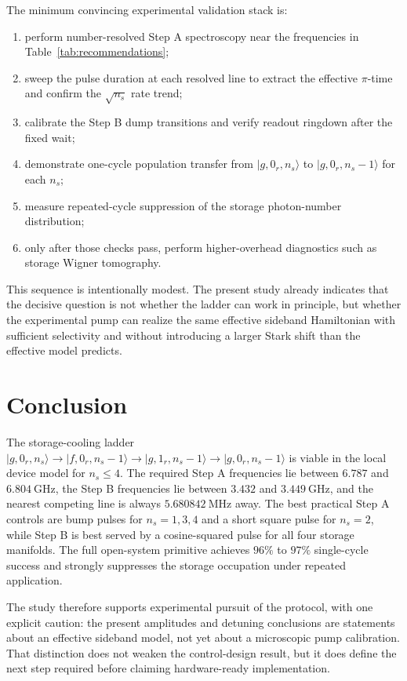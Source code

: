 \documentclass[aps,pra,twocolumn,reprint,floatfix,amsmath,amssymb]{revtex4-2}
\newcommand{\ket}[1]{\lvert #1 \rangle}
\begin{document}
The minimum convincing experimental validation stack is:
\begin{enumerate}
\item perform number-resolved Step A spectroscopy near the frequencies in Table~\ref{tab:recommendations};
\item sweep the pulse duration at each resolved line to extract the effective \(\pi\)-time and confirm the \(\sqrt{n_s}\) rate trend;
\item calibrate the Step B dump transitions and verify readout ringdown after the fixed wait;
\item demonstrate one-cycle population transfer from \(\ket{g,0_r,n_s}\) to \(\ket{g,0_r,n_s-1}\) for each \(n_s\);
\item measure repeated-cycle suppression of the storage photon-number distribution;
\item only after those checks pass, perform higher-overhead diagnostics such as storage Wigner tomography.
\end{enumerate}

This sequence is intentionally modest. The present study already indicates that the decisive question is not whether the ladder can work in principle, but whether the experimental pump can realize the same effective sideband Hamiltonian with sufficient selectivity and without introducing a larger Stark shift than the effective model predicts.

\section{Conclusion}
The storage-cooling ladder
\(\ket{g,0_r,n_s}\rightarrow\ket{f,0_r,n_s-1}\rightarrow\ket{g,1_r,n_s-1}\rightarrow\ket{g,0_r,n_s-1}\)
is viable in the local device model for \(n_s\le4\). The required Step A frequencies lie between \(6.787\) and \(\SI{6.804}{\giga\hertz}\), the Step B frequencies lie between \(3.432\) and \(\SI{3.449}{\giga\hertz}\), and the nearest competing line is always \(5.680842~\si{\mega\hertz}\) away. The best practical Step A controls are bump pulses for \(n_s=1,3,4\) and a short square pulse for \(n_s=2\), while Step B is best served by a cosine-squared pulse for all four storage manifolds. The full open-system primitive achieves \(96\%\) to \(97\%\) single-cycle success and strongly suppresses the storage occupation under repeated application.

The study therefore supports experimental pursuit of the protocol, with one explicit caution: the present amplitudes and detuning conclusions are statements about an effective sideband model, not yet about a microscopic pump calibration. That distinction does not weaken the control-design result, but it does define the next step required before claiming hardware-ready implementation.
\end{document}
